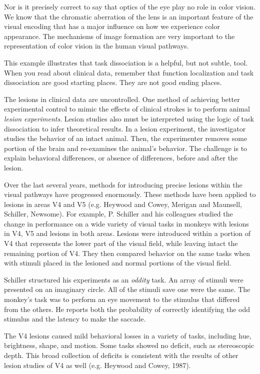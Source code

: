 Nor is it precisely correct to say that optics of the eye play no role
in color vision.  We know that the chromatic aberration of the lens
is an important feature of the visual encoding that has a major
influence on how we experience color appearance.  The mechanisms of image
formation are very important to the representation of color vision in
the human visual pathways.

This example illustrates that task dissociation is a helpful, but not
subtle, tool.  When you read about clinical data, remember that function
localization and task dissociation are good starting places.  They are
not good ending places.

The lesions in clinical data are uncontrolled.  One method of
achieving better experimental control to mimic the effects of
clinical strokes is to perform animal {\em lesion experiments}.
Lesion studies also must be interpreted using the logic of task
dissociation to infer theoretical results.  In a lesion experiment,
the investigator studies the behavior of an intact animal.  Then, the
experimenter removes some portion of the brain and re-examines the
animal's behavior.  The challenge is to explain behavioral
differences, or absence of differences, before and after the lesion.

Over the last several years, methods for introducing precise lesions
within the visual pathways have progressed enormously.  These methods
have been applied to lesions in areas V4 and V5 (e.g. Heywood and
Cowey, Merigan and Maunsell, Schiller, Newsome).  For example,
P. Schiller and his colleagues studied the change in performance on a
wide variety of visual tasks in monkeys with lesions in V4, V5 and
lesions in both areas.  Lesions were introduced within a portion of V4
that represents the lower part of the visual field, while leaving
intact the remaining portion of V4.  They then compared behavior on
the same tasks when with stimuli placed in the lesioned and normal
portions of the visual field.

Schiller structured his experiments as an {\em oddity} task.  An array
of stimuli were presented on an imaginary circle.  All of the stimuli
save one were the same.  The monkey's task was to perform an eye
movement to the stimulus that differed from the others.  He reports
both the probability of correctly identifying the odd stimulus and the
latency to make the saccade.

The V4 lesions caused mild behavioral losses in a variety of tasks,
including hue, brightness, shape, and motion.  Some tasks showed no
deficit, such as stereoscopic depth.  This broad collection of
deficits is consistent with the results of other lesion studies of V4
as well (e.g. Heywood and Cowey, 1987).

